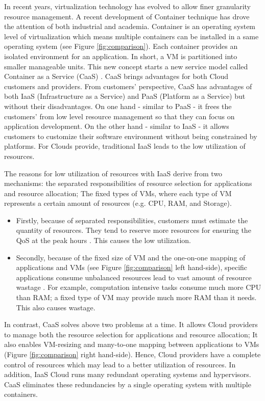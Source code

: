 In recent years, virtualization technology has evolved to allow finer granularity resource management.
A recent development of Container technique \cite{Soltesz:2007cu} has drove the attention of both industrial and academia.
Container is an operating system level of virtualization which means multiple containers can be installed in a same operating system (see Figure \ref{fig:comparison}). Each container provides an isolated environment for an application. In short, a VM is partitioned into smaller manageable units.
This new concept starts a new service model called Container as a Service (CaaS) \cite{Piraghaj:2015uf}. CaaS brings advantages for both Cloud customers and providers.
From customers' perspective, CaaS has advantages of both IaaS (Infrastructure as a Service) and PaaS (Platform as a Service) but without their disadvantages. On one hand - similar to PaaS - it frees the customers' from low level resource management so that they can focus on application development. On the other hand - similar to IaaS - it allows customers to customize their software environment without being constrained by platforms. 
For Clouds provide, traditional IaaS leads to the low utilization of resources. 

The reasons for low utilization of resources with IaaS derive from two mechanisms: the separated responsibilities of resource selection for applications and resource allocation; The fixed types of VMs, where each type of VM represents a certain amount of resources (e.g. CPU, RAM, and Storage). 
\begin{itemize}
	\item Firstly, because of separated responsibilities, customers must estimate the quantity of resources. They tend to reserve more resources for ensuring the QoS at the peak hours \cite{Chaisiri:2012cv}. This causes the low utilization.
	\item Secondly, because of the fixed size of VM and the one-on-one mapping of applications and VMs (see Figure \ref{fig:comparison} left hand-side), specific applications consume unbalanced resources lead to vast amount of resource wastage \cite{Tomas:2013iv}. For example, computation intensive tasks consume much more CPU than RAM; a fixed type of VM may provide much more RAM than it needs. This also causes wastage.
\end{itemize}

In contrast, CaaS solves above two problems at a time. It allows Cloud providers to manage both the resource selection for applications and resource allocation; It also enables VM-resizing and many-to-one mapping between applications to VMs (Figure \ref{fig:comparison} right hand-side).
Hence, Cloud providers have a complete control of resources which may lead to a better utilization of resources. 
In addition, IaaS Cloud runs many redundant operating systems and hypervisors. CaaS eliminates these redundancies by a single operating system with multiple containers.


